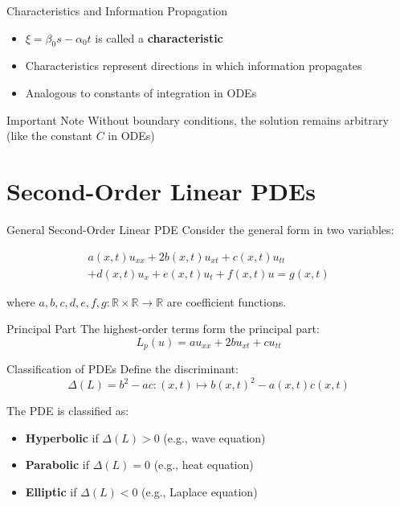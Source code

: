 \documentclass{beamer}
\begin{document}
\begin{frame}{Characteristics and Information Propagation}
    \begin{itemize}
        \item $\xi = \beta_0s - \alpha_0t$ is called a \textbf{characteristic}
        \item Characteristics represent directions in which information propagates
        \item Analogous to constants of integration in ODEs
    \end{itemize}
    
    \begin{alertblock}{Important Note}
        Without boundary conditions, the solution remains arbitrary (like the constant $C$ in ODEs)
    \end{alertblock}
\end{frame}


\section{Second-Order Linear PDEs}

\begin{frame}{General Second-Order Linear PDE}
    Consider the general form in two variables:


    \begin{multline}
        a(x,t)u_{xx} 
        + 2b(x,t)u_{xt} 
        + c(x,t)u_{tt} 
        \\
        + d(x,t)u_x 
        + e(x,t)u_t 
        + f(x,t)u 
        = g(x,t)
    \end{multline}

    where $a,b,c,d,e,f,g: \mathbb{R} \times \mathbb{R} \rightarrow \mathbb{R}$ are coefficient functions.
    
    \begin{block}{Principal Part}
        The highest-order terms form the principal part:
        \[
        L_p(u) = a u_{xx} + 2b u_{xt} + c u_{tt}
        \]
    \end{block}
\end{frame}

\begin{frame}{Classification of PDEs}
    Define the discriminant:
    \[
    \Delta(L) = b^2 - ac : (x,t) \mapsto b(x,t)^2 - a(x,t)c(x,t)
    \]
    
    The PDE is classified as:
    \begin{itemize}
        \item \textbf{Hyperbolic} if $\Delta(L) > 0$ (e.g., wave equation)
        \item \textbf{Parabolic} if $\Delta(L) = 0$ (e.g., heat equation)
        \item \textbf{Elliptic} if $\Delta(L) < 0$ (e.g., Laplace equation)
    \end{itemize}
\end{frame}
\end{document}
